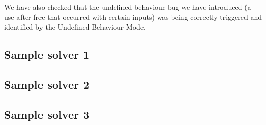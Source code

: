 \documentclass{article}
\begin{document}
We have also checked that the undefined behaviour bug we have introduced (a use-after-free that occurred with certain
inputs) was being correctly triggered and identified by the Undefined Behaviour Mode. \\

\subsection{Sample solver 1}

\subsection{Sample solver 2}

\subsection{Sample solver 3}
\end{document}
